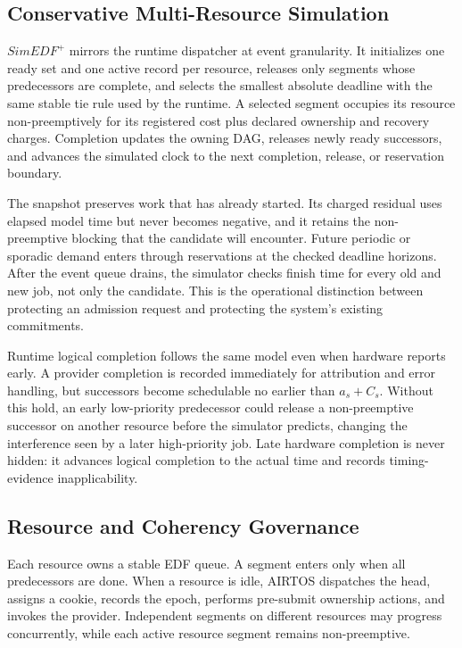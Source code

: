 \documentclass[lettersize,journal]{IEEEtran}
\begin{document}
\subsection{Conservative Multi-Resource Simulation}
$SimEDF^+$ mirrors the runtime dispatcher at event granularity. It initializes
one ready set and one active record per resource, releases only segments whose
predecessors are complete, and selects the smallest absolute deadline with the
same stable tie rule used by the runtime. A selected segment occupies its
resource non-preemptively for its registered cost plus declared ownership and
recovery charges. Completion updates the owning DAG, releases newly ready
successors, and advances the simulated clock to the next completion, release,
or reservation boundary.

The snapshot preserves work that has already started. Its charged residual
uses elapsed model time but never becomes negative, and it retains the
non-preemptive blocking that the candidate will encounter. Future periodic or
sporadic demand enters through reservations at the checked deadline horizons.
After the event queue drains, the simulator checks finish time for every old
and new job, not only the candidate. This is the operational distinction
between protecting an admission request and protecting the system's existing
commitments.

Runtime logical completion follows the same model even when hardware reports
early. A provider completion is recorded immediately for attribution and error
handling, but successors become schedulable no earlier than $a_s+C_s$.
Without this hold, an early low-priority predecessor could release a
non-preemptive successor on another resource before the simulator predicts,
changing the interference seen by a later high-priority job. Late hardware
completion is never hidden: it advances logical completion to the actual time
and records timing-evidence inapplicability.

\subsection{Resource and Coherency Governance}
Each resource owns a stable EDF queue. A segment enters only when all
predecessors are done. When a resource is idle, AIRTOS dispatches the head,
assigns a cookie, records the epoch, performs pre-submit ownership actions, and
invokes the provider. Independent segments on different resources may progress
concurrently, while each active resource segment remains non-preemptive.
\end{document}
